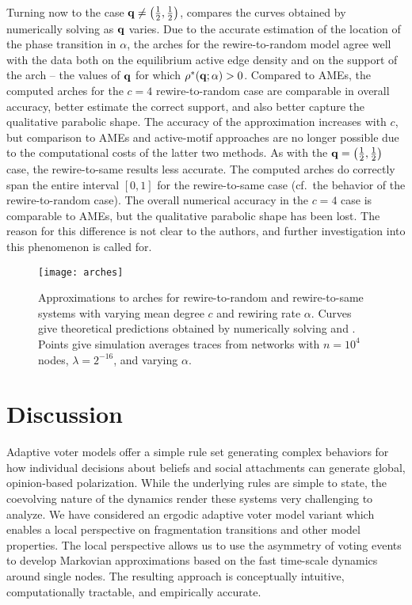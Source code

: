 \documentclass[review, onefignum, onetabnum]{siamart171218}
\begin{document}
		Turning now to the case $\mathbf{q} \neq \left(\frac{1}{2}, \frac{1}{2}\right)$,  compares the curves obtained by numerically solving  as $\mathbf{q}$ varies. 
		Due to the accurate estimation of the location of the phase transition in $\alpha$, the arches for the rewire-to-random model agree well with the data both on the equilibrium active edge density and on the support of the arch -- the values of $\mathbf{q}$ for which $\rho^*(\mathbf{q};\alpha) > 0$. 
		Compared to AMEs, the computed arches for the $c = 4$ rewire-to-random case are comparable in overall accuracy, better estimate the correct support, and also better capture the qualitative parabolic shape.  
		The accuracy of the approximation increases with $c$, but comparison to AMEs and active-motif approaches are no longer possible due to the computational costs of the latter two methods. 
		As with the $\mathbf{q} = \left(\frac{1}{2}, \frac{1}{2}\right)$ case, the rewire-to-same results less accurate. 
		The computed arches do correctly span the entire interval $[0,1]$ for the rewire-to-same case (cf.\ the behavior of the rewire-to-random case). 
		The overall numerical accuracy in the $c = 4$ case is comparable to AMEs, but the qualitative parabolic shape has been lost. 
		The reason for this difference is not clear to the authors, and further investigation into this phenomenon is called for. 

		\begin{figure}
			\centering
				\texttt{[image: arches]}
			\caption{Approximations to arches for rewire-to-random and rewire-to-same systems with varying mean degree $c$ and rewiring rate $\alpha$. 
			Curves give theoretical predictions obtained by numerically solving  and . 
			Points give simulation averages traces from networks with $n = 10^4$ nodes,  $\lambda = 2^{-16}$, and varying $\alpha$.}
			\label{fig:arches}
		\end{figure}

\section{Discussion}

	Adaptive voter models offer a simple rule set generating complex behaviors for how individual decisions about beliefs and social attachments can generate global, opinion-based polarization. 
	While the underlying rules are simple to state, the coevolving nature of the dynamics render these systems very challenging to analyze. 
	We have considered an ergodic adaptive voter model variant which enables a local perspective on fragmentation transitions and other model properties. 
	The local perspective allows us to use the asymmetry of voting events to develop Markovian approximations based on the fast time-scale dynamics around single nodes. 
	The resulting approach is conceptually intuitive, computationally tractable, and empirically accurate. 
	
\end{document}

